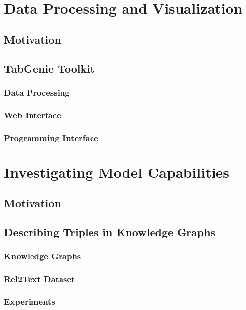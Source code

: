 \documentclass[12pt,notitlepage,a4paper,openright]{report}
\begin{document}
\chapter{Data Processing and Visualization}
\label{chap:tabgenie}
\section{Motivation}
\label{sec:data-mot}
\section{TabGenie Toolkit}
\label{sec:tabgenie}
\subsection{Data Processing}
\label{sec:tabgenie-data}
\subsection{Web Interface}
\label{sec:tabgenie-web}
\subsection{Programming Interface}
\label{sec:tabgenie-cli}


\chapter{Investigating Model Capabilities}
\label{chap:investigating}
\section{Motivation}
\label{sec:investigating-mot}
\section{Describing Triples in Knowledge Graphs}
\label{sec:describing}
\subsection{Knowledge Graphs}
\label{sec:kgs}
\subsection{Rel2Text Dataset}
\label{sec:rel2text}
\subsection{Experiments}
\label{sec:rel2text-exp}
\end{document}
